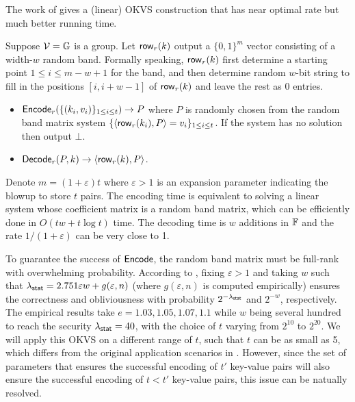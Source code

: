 The work of \cite{cryptoeprint:2023/903} gives a (linear) OKVS construction that has near optimal rate but much better running time. 

\begin{construction}\label{con:OKVS_ribbon}
  Suppose $\mathcal{V} = \mathbb{G}$ is a group. Let ${\sf row}_r(k)$ output a $\{0,1\}^m$ vector consisting of a width-$w$ random band. Formally speaking, ${\sf row}_r(k)$ first determine a starting point $1\le i\le m-w+1$ for the band, and then determine random $w$-bit string to fill in the positions $[i,i+w-1]$ of ${\sf row}_r(k)$ and leave the rest as 0 entries. 
  \begin{itemize}
    \item ${\sf Encode}_r(\{(k_i,v_i)\}_{1\le i\le t})\rightarrow P$ where $P$ is randomly chosen from the random band matrix system $\{\langle {\sf row}_r(k_i), P \rangle=v_i\}_{1\le i\le t}$. If the system has no solution then output $\bot$. 
    \item ${\sf Decode}_r(P,k)\rightarrow \langle {\sf row}_r(k), P \rangle$. 
  \end{itemize}
  
\end{construction}

Denote $m=(1+\varepsilon)t$ where $\varepsilon>1$ is an expansion parameter indicating the blowup to store $t$ pairs. The encoding time is equivalent to solving a linear system whose coefficient matrix is a random band matrix, which can be efficiently done in $O(tw+t\log t)$ time. The decoding time is $w$ additions in $\mathbb{F}$ and the rate $1/(1+\varepsilon)$ can be very close to 1. 

To guarantee the success of ${\sf Encode}$, the random band matrix must be full-rank with overwhelming probability. According to \cite{cryptoeprint:2023/903}, fixing $\varepsilon>1$ and taking $w$ such that $\lambda_{\sf stat} = 2.751\varepsilon w+g(\varepsilon,n)$ (where $g(\varepsilon,n)$ is computed empirically) ensures the correctness and obliviousness with probability $2^{-\lambda_{\sf stat}}$ and $2^{-w}$, respectively. The empirical results take $e=1.03,1.05,1.07,1.1$ while $w$ being several hundred to reach the security $\lambda_{\sf stat}=40$, with the choice of $t$ varying from $2^{10}$ to $2^{20}$. We will apply this OKVS on a different range of $t$, such that $t$ can be as small as 5, which differs from the original application scenarios in \cite{cryptoeprint:2023/903}. However, since the set of parameters that ensures the successful encoding of $t'$ key-value pairs will also ensure the successful encoding of $t<t'$ key-value pairs, this issue can be natually resolved. %

